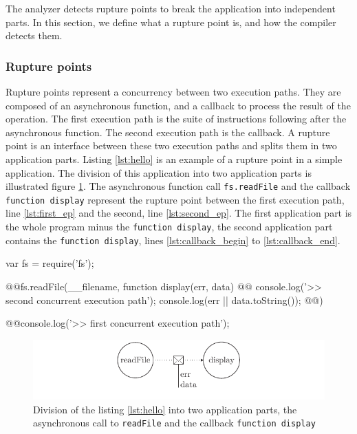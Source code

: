 The analyzer detects rupture points to break the application into independent parts.
In this section, we define what a rupture point is, and how the compiler detects them.

\subsubsection{Rupture points}

Rupture points represent a concurrency between two execution paths.
They are composed of an asynchronous function, and a callback to process the result of the operation.
The first execution path is the suite of instructions following after the asynchronous function.
The second execution path is the callback.
A rupture point is an interface between these two execution paths and splits them in two application parts.
Listing \ref{lst:hello} is an example of a rupture point in a simple application.
The division of this application into two application parts is illustrated figure \ref{fig:flux-1}.
The asynchronous function call \texttt{fs.readFile} and the callback \texttt{function display} represent the rupture point between the first execution path, line \ref{lst:first_ep} and the second, line \ref{lst:second_ep}.
The first application part is the whole program minus the \texttt{function display}, the second application part contains the \texttt{function display}, lines \ref{lst:callback_begin} to \ref{lst:callback_end}.

\begin{code}[js, caption={Example of a rupture point : an asynchronous function call, \texttt{fs.readFile()}, with a callback parameter, \texttt{function display}},label={lst:hello}]
var fs = require('fs');

@\label{lst:callback_begin}@fs.readFile(__filename, function display(err, data) {
@\label{lst:second_ep}@  console.log('>> second concurrent execution path');
  console.log(err || data.toString());
@\label{lst:callback_end}@})

@\label{lst:first_ep}@console.log('>> first concurrent execution path');
\end{code}

\begin{figure}[h!]
\begin{center}
  \includegraphics[width=\linewidth]{ressources/flux-1.pdf}
  \caption{Division of the listing \ref{lst:hello} into two application parts, the asynchronous call to \texttt{readFile} and the callback \texttt{function display}}
  \label{fig:flux-1}
\end{center}
\end{figure}

